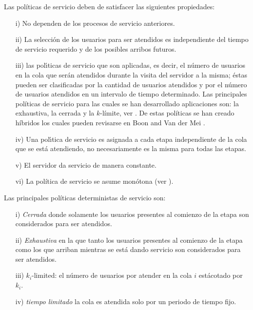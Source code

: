 \documentclass{article}
\numberwithin{equation}{section}
\begin{document}
Las pol\'iticas de servicio deben de satisfacer las siguientes propiedades:
\begin{itemize}
\item[i)] No dependen de los procesos de servicio anteriores.
\item[ii)] La selecci\'on de los usuarios para ser atendidos es independiente del tiempo de servicio requerido  y de los posibles arribos futuros.
\item[iii)] las pol{\'\i}ticas de servicio que son aplicadas, es decir, el n\'umero de usuarios en la cola que ser{\'a}n atendidos durante la visita del servidor a la misma; \'estas pueden ser clasificadas por la cantidad de usuarios atendidos y por el n\'umero de usuarios atendidos en un intervalo de tiempo determinado. Las principales pol\'iticas de servicio para las cuales se han desarrollado aplicaciones son: la exhaustiva, la cerrada y la $k$-l\'imite, ver \cite{LevySidi, Takagi, Semenova}. De estas pol\'iticas se han creado h\'ibridos los cuales pueden revisarse en Boon and Van der Mei \cite{BoonMeiWinands}.

\item[iv)] Una pol{\'\i}tica de servicio es asignada a cada etapa independiente de la cola que se est{\'a} atendiendo, no necesariamente es la misma para todas las etapas.
\item[v)] El servidor da servicio de manera constante.

\item[vi)] La pol\'itica de servicio se asume mon\'otona (ver
\cite{Stability}).

\end{itemize}

Las principales pol\'iticas deterministas de servicio son:
\begin{itemize}

\item[i)] {\em Cerrada} donde solamente los usuarios presentes al comienzo de la etapa son considerados para ser atendidos.

\item[ii)] {\em Exhaustiva} en la que tanto los usuarios presentes al comienzo de la etapa como los que arriban   mientras se est\'a dando servicio son considerados para ser atendidos.

\item[iii)] $k_{i}$-limited: el n\'umero de usuarios por atender en la cola $i$ est\' acotado por $k_{i}$.

\item[iv)] {\em tiempo limitado} la cola es atendida solo por un periodo de tiempo fijo.
\end{itemize}
\end{document}
